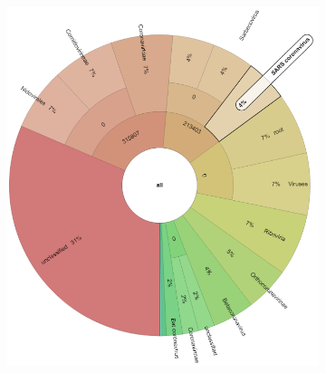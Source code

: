     \begin{figure}[H]
        \centering
        \begin{subfigure}[b]{0.45\textwidth}
        \includegraphics[width=1\textwidth]{figures/results/real/krona/krona-us-sSRR17578350.png}
        \label{fig:results:real:krona-us-a}
        \end{subfigure}
        \hfill
        \begin{subfigure}[b]{0.45\textwidth}

\end{subfigure}
\end{figure}
